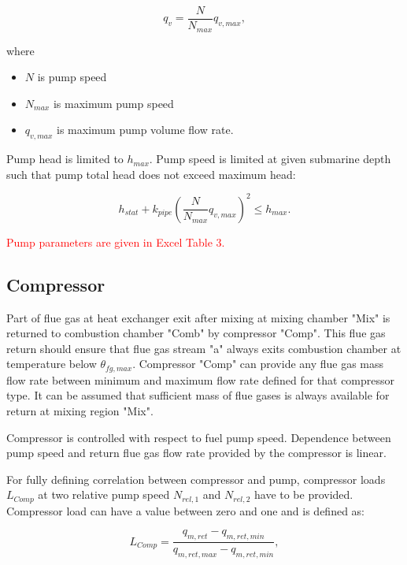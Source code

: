 \documentclass{article}
\begin{document}
	\begin{equation}\label{eq:pump_vol_flow}
		q_v = \frac{N}{N_{max}} q_{v,max},
	\end{equation}
	
	\noindent
	where
	
	\begin{itemize}
		\item $N$ is pump speed
		\item $N_{max}$ is maximum pump speed
		\item $q_{v,max}$ is maximum pump volume flow rate.
	\end{itemize}

	\noindent
	Pump head is limited to $h_{max}$. Pump speed is limited at given submarine depth such that pump total head does not exceed maximum head:
	
	\begin{equation}\label{eq:total_head_limit}
		h_{stat} + k_{pipe} \left( \frac{N}{N_{max}} q_{v,max} \right)^2 \leq h_{max}.
	\end{equation}
	
	\noindent
	\textcolor{red}{Pump parameters are given in Excel Table 3.}
	
	\subsection{Compressor}
	
	Part of flue gas at heat exchanger exit after mixing at mixing chamber 
	"Mix" is returned to combustion chamber "Comb" by compressor "Comp". This 
	flue gas return should ensure that flue gas stream "a" always exits 
	combustion chamber at temperature below $\theta_{fg,max}$. Compressor 
	"Comp" can provide any flue gas mass flow rate between minimum and maximum 
	flow rate defined for that compressor type. It can be assumed that 
	sufficient mass of flue gases is always available for return at mixing 
	region "Mix".
	
	Compressor is controlled with respect to fuel pump speed.  Dependence between pump speed and return flue gas flow rate provided by the compressor is linear. 
	
	For fully defining correlation between compressor and pump, compressor loads $L_{Comp}$ at two relative pump speed $N_{rel,1}$ and $N_{rel,2}$ have to be provided. Compressor load can have a value between zero and one and is defined as:
	
	\begin{equation}\label{eq:compressor_load}
		L_{Comp} = \frac{q_{m,ret} - q_{m,ret,min}}{q_{m,ret,max} - q_{m,ret,min}},
	\end{equation}
	
\end{document}
